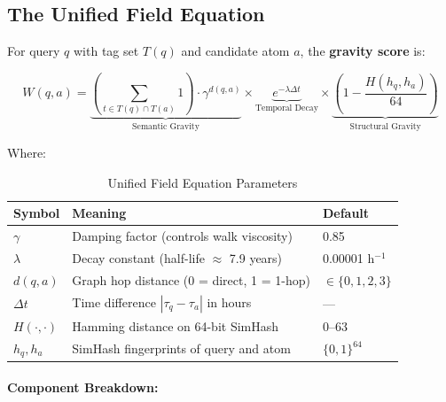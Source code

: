 \documentclass[11pt]{article}
\begin{document}
\subsection{The Unified Field Equation}

For query $q$ with tag set $T(q)$ and candidate atom $a$, the \textbf{gravity score} is:

\begin{equation}
\label{eq:unified_field}
W(q, a) = \underbrace{\left(\sum_{t \in T(q) \cap T(a)} 1\right) \cdot \gamma^{d(q,a)}}_{\text{Semantic Gravity}} \times \underbrace{e^{-\lambda \Delta t}}_{\text{Temporal Decay}} \times \underbrace{\left(1 - \frac{H(h_q, h_a)}{64}\right)}_{\text{Structural Gravity}}
\end{equation}

Where:

\begin{table}[h]
\centering
\caption{Unified Field Equation Parameters}
\label{tab:parameters}
\begin{tabular}{@{}lll@{}}
\toprule
\textbf{Symbol} & \textbf{Meaning} & \textbf{Default} \\ \midrule
$\gamma$ & Damping factor (controls walk viscosity) & 0.85 \\
$\lambda$ & Decay constant (half-life $\approx$ 7.9 years) & 0.00001 h$^{-1}$ \\
$d(q,a)$ & Graph hop distance (0 = direct, 1 = 1-hop) & $\in \{0,1,2,3\}$ \\
$\Delta t$ & Time difference $|\tau_q - \tau_a|$ in hours & --- \\
$H(\cdot,\cdot)$ & Hamming distance on 64-bit SimHash & 0--63 \\
$h_q, h_a$ & SimHash fingerprints of query and atom & $\{0,1\}^{64}$ \\ \bottomrule
\end{tabular}
\end{table}

\paragraph{Component Breakdown:}
\end{document}
